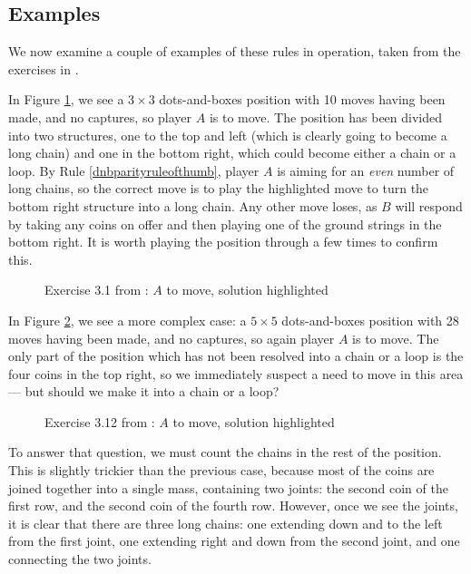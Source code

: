 \documentclass[a4paper,twocolumn]{article}
\begin{document}
\subsection{Examples}

We now examine a couple of examples of these rules in operation, taken
from the exercises in \cite{berl}.

In Figure \ref{ex3p1}, we see a $3 \times 3$ dots-and-boxes position
with 10 moves having been made, and no captures, so player $A$ is to
move. The position has been divided into two structures, one to the
top and left (which is clearly going to become a long chain) and one
in the bottom right, which could become either a chain or a loop. By
Rule \ref{dnbparityruleofthumb}, player $A$ is aiming for an
\emph{even} number of long chains, so the correct move is to play the
highlighted move to turn the bottom right structure into a long
chain. Any other move loses, as $B$ will respond by taking any coins
on offer and then playing one of the ground strings in the bottom
right. It is worth playing the position through a few times to confirm
this.

\begin{figure}
  \centering
  \def\svgscale{0.7}
  
  \caption{Exercise 3.1 from \cite{berl}: $A$ to move, solution highlighted}
  \label{ex3p1}
\end{figure}

In Figure \ref{ex3p12}, we see a more complex case: a $5 \times 5$
dots-and-boxes position with 28 moves having been made, and no
captures, so again player $A$ is to move. The only part of the
position which has not been resolved into a chain or a loop is the
four coins in the top right, so we immediately suspect a need to move
in this area --- but should we make it into a chain or a loop?

\begin{figure}
  \centering
  \def\svgscale{0.7}
  
  \caption{Exercise 3.12 from \cite{berl}: $A$ to move, solution highlighted}
  \label{ex3p12}
\end{figure}

To answer that question, we must count the chains in the rest of the
position. This is slightly trickier than the previous case, because
most of the coins are joined together into a single mass, containing
two joints: the second coin of the first row, and the second coin of
the fourth row. However, once we see the joints, it is clear that
there are three long chains: one extending down and to the left from
the first joint, one extending right and down from the second joint,
and one connecting the two joints.
\end{document}
